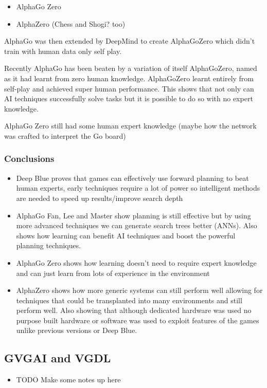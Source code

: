 \documentclass[a4paper]{article}
\begin{document}
\begin{itemize}
    \item AlphaGo Zero
    \item AlphaZero (Chess and Shogi? too)
\end{itemize}


AlphaGo was then extended by DeepMind to create AlphaGoZero which didn't train with human data only self play\cite{alphaGoZero}.
\par
Recently AlphaGo has been beaten by a variation of itself AlphaGoZero, named as it had learnt from zero human knowledge\cite{alphaGoZero}.
AlphaGoZero learnt entirely from self-play and achieved super human performance.
This shows that not only can AI techniques successfully solve tasks but it is possible to do so with no expert knowledge.

AlphaGo Zero still had some human expert knowledge (maybe how the network was crafted to interpret the Go board)



\subsubsection{Conclusions}
\begin{itemize}
    \item Deep Blue proves that games can effectively use forward planning to beat human experts, early techniques require a lot of power so intelligent methods are needed to speed up results/improve search depth
    \item AlphaGo Fan, Lee and Master show planning is still effective but by using more advanced techniques we can generate search trees better (ANNs).
    Also shows how learning can benefit AI techniques and boost the powerful planning techniques.
    \item AlphaGo Zero shows how learning doesn't need to require expert knowledge and can just learn from lots of experience in the environment
    \item AlphaZero shows how more generic systems can still perform well allowing for techniques that could be transplanted into many environments and still perform well.
    Also showing that although dedicated hardware was used no purpose built hardware or software was used to exploit features of the games unlike previous versions or Deep Blue.
\end{itemize}


\subsection{GVGAI and VGDL}
\begin{itemize}
    \item TODO Make some notes up here
\end{itemize}
\end{document}
